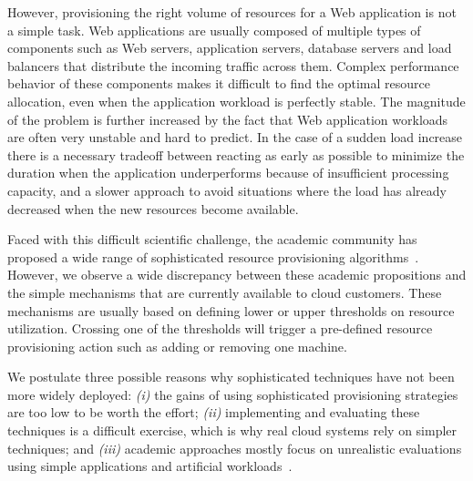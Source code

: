 However, provisioning the right volume of resources for a Web
application is not a simple task. Web applications are usually
composed of multiple types of components such as Web servers,
application servers, database servers and load balancers that
distribute the incoming traffic across them. Complex performance
behavior of these components makes it difficult to find the optimal
resource allocation, even when the application workload is perfectly
stable. The magnitude of the problem is further increased by the fact
that Web application workloads are often very unstable and hard to
predict. In the case of a sudden load increase there is a necessary
tradeoff between reacting as early as possible to minimize the
duration when the application underperforms because of insufficient
processing capacity, and a slower approach to avoid situations where
the load has already decreased when the new resources become
available.

Faced with this difficult scientific challenge, the academic community
has proposed a wide range of sophisticated resource provisioning
algorithms~\cite{muppala_regression-based_2012, urgaonkar_agile_2008,vasic_dejavu:_2012}. 
However, we observe a wide discrepancy between these academic propositions
and the simple mechanisms that are currently available to cloud
customers. These mechanisms are usually based on defining lower or
upper thresholds on resource utilization. Crossing one of the
thresholds will trigger a pre-defined resource provisioning action
such as adding or removing one machine.

We postulate three possible reasons why sophisticated techniques have
not been more widely deployed: \emph{(i)} the gains of using
sophisticated provisioning strategies are too low to be worth the
effort; \emph{(ii)} implementing and evaluating these techniques is a
difficult exercise, which is why real cloud systems rely on simpler
techniques; and \emph{(iii)} academic approaches mostly focus on
unrealistic evaluations using simple applications and artificial
workloads~\cite{do_profiling_2011, islam_empirical_2012}. %

